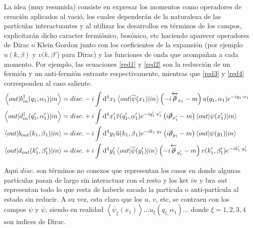 \documentclass[tickz]{article}
\numberwithin{equation}{section}
\begin{document}
La idea (muy resumida) consiste en expresar los momentos como operadores
de creación aplicados al vació, los cuales dependerán de la naturaleza
de las partículas interactuantes y al utilizar los desarrollos en términos de
los campos, explicitarán dicho caracter fermiónico, bosónico, etc
haciendo aparecer operadores de Dirac o Klein Gordon junto con los
coeficientes de la expansión (por ejemplo $u(k,\beta)$ y $v(k,\beta'$)
para Dirac) y las funciones de onda que acompañan a cada momento.
Por ejemplo, las ecuaciones \ref{red1} y \ref{red2}  son la reducción de un fermión
y un anti-fermión entrante respectivamente, mientras que \ref{red3}  y \ref{red4}  corresponden
al caso saliente.
\begin{subequations}\label{red}
	\begin{align}
	\left\langle out|b_{in}^{\dagger}(q_{1},\alpha_{1})|in\right\rangle  & =disc.-i\int \mathrm{d^4}x_{1}\left\langle out|\overline{\psi}(x_{1})|in\right\rangle \left(-i\overleftarrow{\cancel{\partial}}_{x_{1}}-m\right)u(q_{1},\alpha_{1})e^{-iq_{1}\cdot x_{1}} \label{red1}\\
	\left\langle out|d_{in}^{\dagger}(q'_{1},\alpha'_{1})|in\right\rangle  & =disc.+i\int \mathrm{d^4}x'_{1}\overline{v}(q'_{1},\alpha'_{1})e^{-iq'_{1}\cdot x'_{1}}\left(i\cancel{\partial}_{x'_{1}}-m\right)\left\langle out|\psi(x'_{1})|in\right\rangle \label{red2} \\
	\left\langle out|b_{out}(k{}_{1},\beta{}_{1})|in\right\rangle  & =disc.-i\int \mathrm{d^4}y_{1}\overline{u}(k_{1},\beta{}_{1})e^{-ik_{1}\cdot y_{1}}\left(i\cancel{\partial}_{y_{1}}-m\right)\left\langle out|\psi(y_{1})|in\right\rangle \label{red3} \\
	\left\langle out|d_{out}(k'_{1},\beta'_{1})|in\right\rangle  & =disc.+i\int \mathrm{d^4}y'_{1}\left\langle out|\overline{\psi}(y'_{1})|in\right\rangle \left(-i\overleftarrow{\cancel{\partial}}_{y'_{1}}-m\right)v(k'_{1},\beta'_{1})e^{-ik'_{1}\cdot y'_{1}} \label{red4}
	\end{align}
\end{subequations}

Aqui $disc.$ son términos no conexos que representan los casos en
donde algunas partículas pasan de largo sin interactuar con el resto
y los ket $ in $ y bra $ out $ representan todo lo que resta de haberle sacado
la partícula o anti-partícula al estado sin reducir. A su vez, esta
claro que los $ u $, $ v $, etc, se contraen con los campos $\psi$ y $\overline{\psi}$,
siendo en realidad $\left\langle \overline{\psi}_{\xi}(x_{1})\right\rangle ...u_{\xi}(q_{1,}\alpha_{1})$...
donde $\xi=1,2,3,4$ son indices de Dirac.
\end{document}
